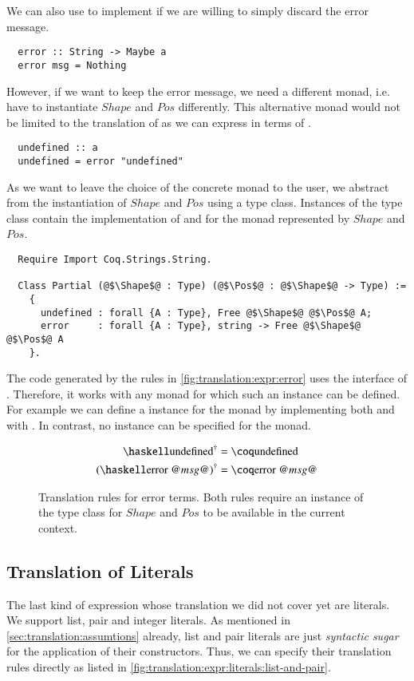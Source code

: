 We can also use  to implement  if we are willing to simply discard the error message.
\begin{verbatim}
  error :: String -> Maybe a
  error msg = Nothing
\end{verbatim}
However, if we want to keep the error message, we need a different monad, i.e. have to instantiate $Shape$ and $Pos$ differently.
This alternative monad would not be limited to the translation of  as we can express  in terms of .
\begin{verbatim}
  undefined :: a
  undefined = error "undefined"
\end{verbatim}

As we want to leave the choice of the concrete monad to the user, we abstract from the instantiation of $Shape$ and $Pos$ using a type class.
Instances of the type class contain the implementation of  and  for the monad represented by $Shape$ and $Pos$.
\begin{verbatim}
  Require Import Coq.Strings.String.

  Class Partial (@$\Shape$@ : Type) (@$\Pos$@ : @$\Shape$@ -> Type) :=
    {
      undefined : forall {A : Type}, Free @$\Shape$@ @$\Pos$@ A;
      error     : forall {A : Type}, string -> Free @$\Shape$@ @$\Pos$@ A
    }.
\end{verbatim}
The code generated by the rules in \autoref{fig:translation:expr:error} uses the interface of .
Therefore, it works with any monad for which such an instance can be defined.
For example we can define a  instance for the  monad by implementing both  and  with .
In contrast, no  instance can be specified for the  monad.

\begin{figure}[H]
  \begin{align*}
    \toCoq{\haskellM{undefined}}       &= \coqM{undefined} \\
    \toCoq{(\haskellM{error @$msg$@})} &= \coqM{error @$msg$@}
  \end{align*}
  \caption{
    Translation rules for error terms.
    Both rules require an instance of the  type class for $Shape$ and $Pos$ to be available in the current context.
  }
  \label{fig:translation:expr:error}
\end{figure}

\subsection{Translation of Literals} \label{sec:translation:expr:literals}
The last kind of expression whose translation we did not cover yet are literals.
We support list, pair and integer literals.
As mentioned in \autoref{sec:translation:assumtions} already, list and pair literals are just \textit{syntactic sugar} for the application of their constructors.
Thus, we can specify their translation rules directly as listed in \autoref{fig:translation:expr:literals:list-and-pair}.

